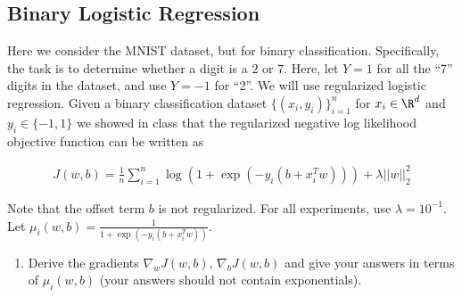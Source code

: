 \documentclass[shortlabels]{article}
\begin{document}
\subsection*{Binary Logistic Regression}
\begin{aprob}
    Here we consider the MNIST dataset, but for binary classification. Specifically, the task is to determine whether a digit is a $2$ or $7$.
    Here, let $Y=1$ for all the ``7'' digits in the dataset, and use $Y=-1$ for ``2''.
    We will use regularized logistic regression. 
    Given a binary classification dataset $\{(x_i,y_i)\}_{i=1}^n$ for $x_i \in \R^d$ and $y_i \in \{-1,1\}$ we showed in class that the regularized negative log likelihood objective function can be written as
    
    \begin{align*}
        J(w,b) = \frac{1}{n} \sum_{i=1}^n \log( 1 + \exp(-y_i (b + x_i^T w))) + \lambda ||w||_2^2
    \end{align*}

    Note that the offset term $b$ is not regularized. 
    For all experiments, use $\lambda = 10^{-1}$. 
    Let $\mu_i(w,b) = \frac{1}{1+ \exp(-y_i (b + x_i^T w))}$. 
    \begin{enumerate}
        \item {} Derive the gradients $\nabla_w J(w,b)$, $\nabla_{b} J(w,b)$ and give your answers in terms of $\mu_i(w,b)$ (your answers should not contain exponentials).

\end{enumerate}
\end{aprob}
\end{document}
